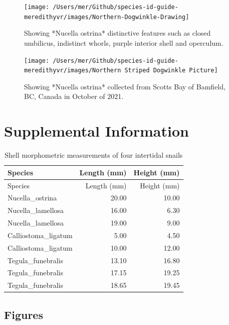 \documentclass[
]{article}
\begin{document}
\begin{figure}

\texttt{[image: /Users/mer/Github/species-id-guide-meredithyvr/images/Northern-Dogwinkle-Drawing]} \hfill{}

\caption{Showing *Nucella ostrina* distinctive features such as closed umbilicus, indistinct whorls, purple interior shell and operculum. }\label{fig:Dogwinkle_drawing}
\end{figure}

\begin{figure}

\texttt{[image: /Users/mer/Github/species-id-guide-meredithyvr/images/Northern Striped Dogwinkle Picture]} \hfill{}

\caption{Showing *Nucella ostrina* collected from Scotts Bay of Bamfield, BC, Canada in October of 2021.}\label{fig:Dogwinkle_picture}
\end{figure}

\newpage

\hypertarget{supplemental-information}{%
\section{Supplemental Information}\label{supplemental-information}}

\begin{longtable}[]{@{}lrr@{}}
\caption{Shell morphometric measurements of four intertidal
snails}\tabularnewline
\toprule
Species & Length (mm) & Height (mm) \\
\midrule
\endfirsthead
\toprule
Species & Length (mm) & Height (mm) \\
\midrule
\endhead
Nucella\_ostrina & 20.00 & 10.00 \\
Nucella\_lamellosa & 16.00 & 6.30 \\
Nucella\_lamellosa & 19.00 & 9.00 \\
Calliostoma\_ligatum & 5.00 & 4.50 \\
Calliostoma\_ligatum & 10.00 & 12.00 \\
Tegula\_funebralis & 13.10 & 16.80 \\
Tegula\_funebralis & 17.15 & 19.25 \\
Tegula\_funebralis & 18.65 & 19.45 \\
\bottomrule
\end{longtable}

\hypertarget{figures-4}{%
\subsection{Figures}\label{figures-4}}
\end{document}
